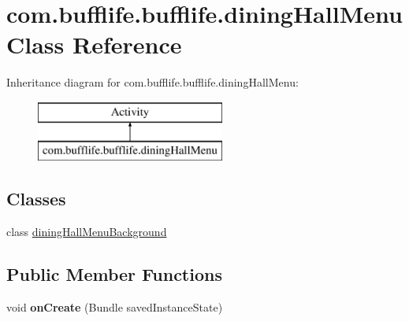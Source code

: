 \hypertarget{classcom_1_1bufflife_1_1bufflife_1_1dining_hall_menu}{}\section{com.\+bufflife.\+bufflife.\+dining\+Hall\+Menu Class Reference}
\label{classcom_1_1bufflife_1_1bufflife_1_1dining_hall_menu}
Inheritance diagram for com.\+bufflife.\+bufflife.\+dining\+Hall\+Menu\+:\begin{figure}[H]
\begin{center}
\leavevmode
\includegraphics[height=2.000000cm]{classcom_1_1bufflife_1_1bufflife_1_1dining_hall_menu}
\end{center}
\end{figure}
\subsection*{Classes}
\begin{DoxyCompactItemize}
\item 
class \hyperlink{classcom_1_1bufflife_1_1bufflife_1_1dining_hall_menu_1_1dining_hall_menu_background}{dining\+Hall\+Menu\+Background}
\end{DoxyCompactItemize}
\subsection*{Public Member Functions}
\begin{DoxyCompactItemize}
\item 
\hypertarget{classcom_1_1bufflife_1_1bufflife_1_1dining_hall_menu_a62abbdded56c5e036a17639715919840}{}void {\bfseries on\+Create} (Bundle saved\+Instance\+State)\label{classcom_1_1bufflife_1_1bufflife_1_1dining_hall_menu_a62abbdded56c5e036a17639715919840}

\end{DoxyCompactItemize}


